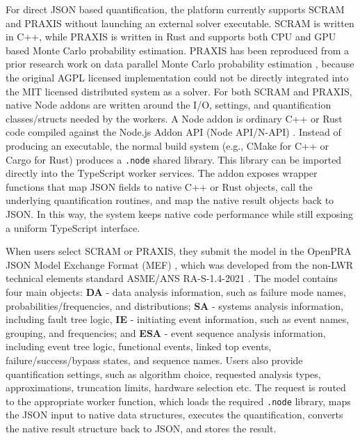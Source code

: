 For direct JSON based quantification, the platform currently supports SCRAM and PRAXIS \cite{praxis} without launching an external solver executable. SCRAM is written in C++, while PRAXIS is written in Rust and supports both CPU and GPU based Monte Carlo probability estimation. PRAXIS has been reproduced from a prior research work on data parallel Monte Carlo probability estimation \cite{arjun_2026}, because the original AGPL licensed implementation \cite{arjun_mcscram} could not be directly integrated into the MIT licensed distributed system as a solver. For both SCRAM and PRAXIS, native Node addons are written around the I/O, settings, and quantification classes/structs needed by the workers. A Node addon is ordinary C++ or Rust code compiled against the Node.js Addon API (Node API/N-API) \cite{napi}. Instead of producing an executable, the normal build system (e.g., CMake for C++ or Cargo for Rust) produces a \texttt{.node} shared library. This library can be imported directly into the TypeScript worker services. The addon exposes wrapper functions that map JSON fields to native C++ or Rust objects, call the underlying quantification routines, and map the native result objects back to JSON. In this way, the system keeps native code performance while still exposing a uniform TypeScript interface.

When users select SCRAM or PRAXIS, they submit the model in the OpenPRA JSON Model Exchange Format (MEF) \cite{openpra_documentation}, which was developed from the non-LWR technical elements standard ASME/ANS RA-S-1.4-2021 \cite{non_lwr_standard}. The model contains four main objects: \textbf{DA} - data analysis information, such as failure mode names, probabilities/frequencies, and distributions; \textbf{SA} - systems analysis information, including fault tree logic, \textbf{IE} - initiating event information, such as event names, grouping, and frequencies; and \textbf{ESA} - event sequence analysis information, including event tree logic, functional events, linked top events, failure/success/bypass states, and sequence names. Users also provide quantification settings, such as algorithm choice, requested analysis types, approximations, truncation limits, hardware selection etc. The request is routed to the appropriate worker function, which loads the required \texttt{.node} library, maps the JSON input to native data structures, executes the quantification, converts the native result structure back to JSON, and stores the result.

